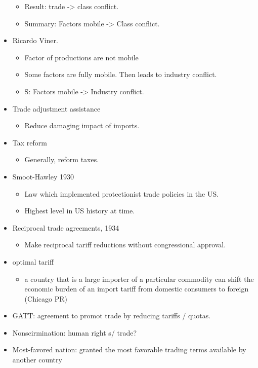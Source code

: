 \documentclass{article}
\begin{document}
\begin{itemize}
\begin{itemize}
      \item Result: trade -> class conflict.
      \item Summary: Factors mobile -> Class conflict.
    \end{itemize}
  \item Ricardo Viner.
    \begin{itemize}
      \item Factor of productions are not mobile 
      \item Some factors are fully mobile.  Then leads to industry conflict.
      \item S: Factors mobile -> Industry conflict.
    \end{itemize}
  \item Trade adjustment assistance
    \begin{itemize}
      \item Reduce damaging impact of imports.
    \end{itemize}
  \item Tax reform
    \begin{itemize}
      \item Generally, reform taxes.
    \end{itemize}
  \item Smoot-Hawley 1930
    \begin{itemize}
      \item Law which implemented protectionist trade policies in the US.
      \item Highest level in US history at time.
    \end{itemize}
  \item Reciprocal trade agreements, 1934
    \begin{itemize}
      \item Make reciprocal tariff reductions without congressional approval.
    \end{itemize}
  \item optimal tariff
    \begin{itemize}
      \item a country that is a large importer of a particular commodity can shift the economic burden of an import tariff from domestic consumers to foreign  (Chicago PR)
    \end{itemize}
  \item GATT: agreement to promot trade by reducing tariffs / quotas.
  \item Nonscirmination: human right s/ trade?
  \item Most-favored nation: granted the most favorable trading terms available by another country

\end{itemize}
\end{document}
